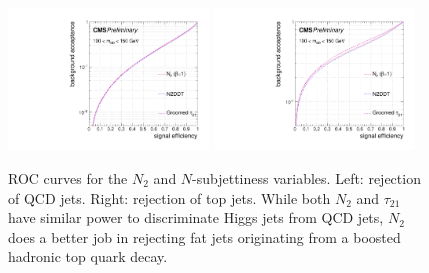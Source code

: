 \begin{figure}
  \centering
  \includegraphics[width=0.475\textwidth]{figures/higgstagging/massCut_roc.pdf}
  \includegraphics[width=0.475\textwidth]{figures/higgstagging/massCut_roc_top.pdf}\\
  \caption{ROC curves for the $N_2$ and $N$-subjettiness variables. Left: rejection of QCD jets. Right: rejection of top jets. While both $N_2$ and $\tau_{21}$ have similar power to discriminate Higgs jets from QCD jets, $N_2$ does a better job in rejecting fat jets originating from a boosted hadronic top quark decay.}
  \label{fig:n2rocs}
\end{figure}


